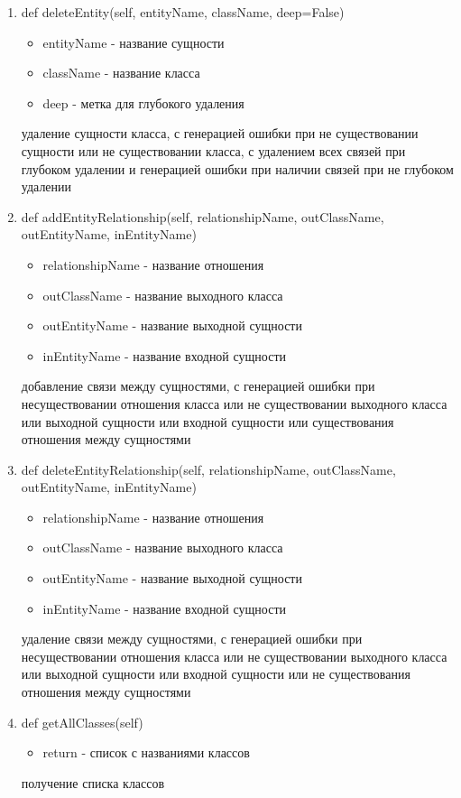 \documentclass{article}
\begin{document}
\begin{enumerate}
	\item def deleteEntity(self, entityName, className, deep=False)
	\begin{itemize}
		\item entityName - название сущности
		\item className - название класса
		\item deep - метка для глубокого удаления
	\end{itemize}
	удаление сущности класса, с генерацией ошибки при не существовании сущности или не существовании класса, с удалением всех связей при глубоком удалении и генерацией ошибки при наличии связей при не глубоком удалении
	
	\item def addEntityRelationship(self, relationshipName, outClassName, outEntityName, inEntityName)
	\begin{itemize}
		\item relationshipName - название отношения
		\item outClassName - название выходного класса
		\item outEntityName - название выходной сущности
		\item inEntityName - название входной сущности
	\end{itemize}
	добавление связи между сущностями, с генерацией ошибки при несуществовании отношения класса или не существовании выходного класса или выходной сущности или входной сущности или существования отношения между сущностями
	
	\item def deleteEntityRelationship(self, relationshipName, outClassName, outEntityName, inEntityName)
	\begin{itemize}
		\item relationshipName - название отношения
		\item outClassName - название выходного класса
		\item outEntityName - название выходной сущности
		\item inEntityName - название входной сущности
	\end{itemize}
	удаление связи между сущностями, с генерацией ошибки при несуществовании отношения класса или не существовании выходного класса или выходной сущности или входной сущности или не существования отношения между сущностями
	
	\item def getAllClasses(self)
	\begin{itemize}
		\item return - список с названиями классов
	\end{itemize}
	получение списка классов
	

\end{enumerate}
\end{document}
